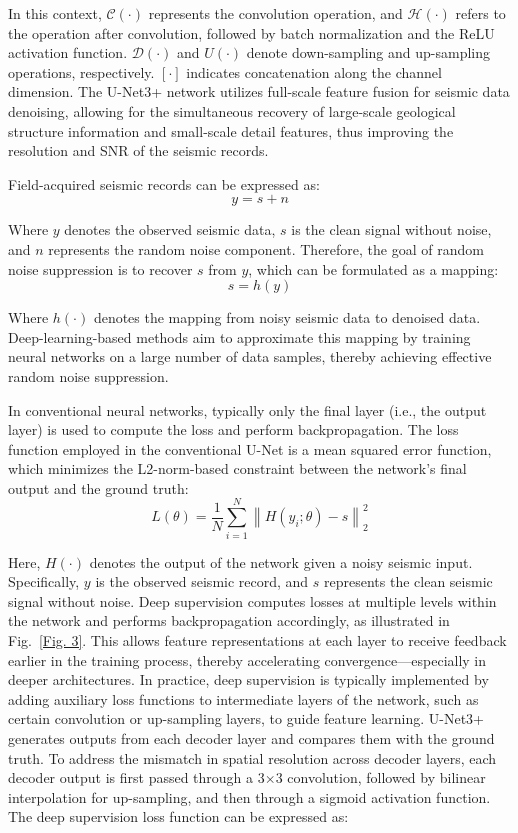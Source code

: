 \documentclass[preprint,12pt,authoryear]{elsarticle}
\begin{document}
In this context, $\mathcal{C} (\cdot)$ represents the convolution operation, and $\mathcal{H} (\cdot)$ refers to the operation after convolution, followed by batch normalization and the ReLU activation function. $\mathcal{D} (\cdot)$ and $U (\cdot)$ denote down-sampling and up-sampling operations, respectively. $[\cdot]$ indicates concatenation along the channel dimension. The U-Net3+ network utilizes full-scale feature fusion for seismic data denoising, allowing for the simultaneous recovery of large-scale geological structure information and small-scale detail features, thus improving the resolution and SNR of the seismic records.

Field-acquired seismic records can be expressed as:
\begin{equation}
y = s + n
\end{equation}

Where $y$ denotes the observed seismic data, $s$ is the clean signal without noise, and $n$ represents the random noise component. Therefore, the goal of random noise suppression is to recover $s$ from $y$, which can be formulated as a mapping:
\begin{equation}
s = h(y)
\end{equation}

Where $h(\cdot)$ denotes the mapping from noisy seismic data to denoised data. Deep-learning-based methods aim to approximate this mapping by training neural networks on a large number of data samples, thereby achieving effective random noise suppression.

In conventional neural networks, typically only the final layer (i.e., the output layer) is used to compute the loss and perform backpropagation. The loss function employed in the conventional U-Net is a mean squared error function, which minimizes the L2-norm-based constraint between the network's final output and the ground truth:
\begin{equation}
L(\theta) = \frac{1}{N} \sum_{i=1}^{N} \left\| H(y_i; \theta) - s \right\|_2^2
\end{equation}

Here, $H (\cdot)$ denotes the output of the network given a noisy seismic input. Specifically, $y$ is the observed seismic record, and $s$ represents the clean seismic signal without noise. Deep supervision computes losses at multiple levels within the network and performs backpropagation accordingly, as illustrated in Fig.~\ref{Fig. 3}. This allows feature representations at each layer to receive feedback earlier in the training process, thereby accelerating convergence---especially in deeper architectures. In practice, deep supervision is typically implemented by adding auxiliary loss functions to intermediate layers of the network, such as certain convolution or up-sampling layers, to guide feature learning. U-Net3+ generates outputs from each decoder layer and compares them with the ground truth. To address the mismatch in spatial resolution across decoder layers, each decoder output is first passed through a 3$\times$3 convolution, followed by bilinear interpolation for up-sampling, and then through a sigmoid activation function. The deep supervision loss function can be expressed as:
\end{document}
